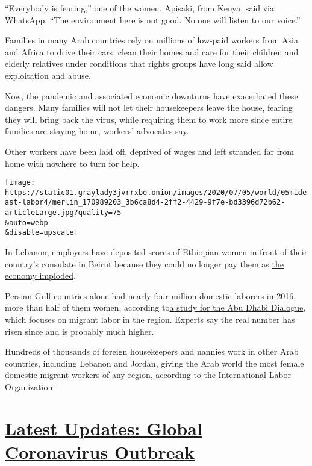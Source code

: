``Everybody is fearing,'' one of the women, Apisaki, from Kenya, said
via WhatsApp. ``The environment here is not good. No one will listen to
our voice.''

Families in many Arab countries rely on millions of low-paid workers
from Asia and Africa to drive their cars, clean their homes and care for
their children and elderly relatives under conditions that rights groups
have long said allow exploitation and abuse.

Now, the pandemic and associated economic downturns have exacerbated
these dangers. Many families will not let their housekeepers leave the
house, fearing they will bring back the virus, while requiring them to
work more since entire families are staying home, workers' advocates
say.

Other workers have been laid off, deprived of wages and left stranded
far from home with nowhere to turn for help.

\texttt{[image: https://static01.graylady3jvrrxbe.onion/images/2020/07/05/world/05mideast-labor4/merlin\_170989203\_3b6ca8d4-2ff2-4429-9f7e-bd3396d72b62-articleLarge.jpg?quality=75\\\&auto=webp\\\&disable=upscale]}

In Lebanon, employers have deposited scores of Ethiopian women in front
of their country's consulate in Beirut because they could no longer pay
them as
\href{https://www.nytimes3xbfgragh.onion/2020/05/10/world/middleeast/lebanon-economic-crisis.html}{the
economy imploded}.

Persian Gulf countries alone had nearly four million domestic laborers
in 2016, more than half of them women, according
to\href{http://abudhabidialogue.org/sites/default/files/document-library/2018_Future\%20of\%20Domestic\%20Work\%20Study.pdf}{a
study for the Abu Dhabi Dialogue}, which focuses on migrant labor in the
region. Experts say the real number has risen since and is probably much
higher.

Hundreds of thousands of foreign housekeepers and nannies work in other
Arab countries, including Lebanon and Jordan, giving the Arab world the
most female domestic migrant workers of any region, according to the
International Labor Organization.

\hypertarget{latest-updates-global-coronavirus-outbreak}{%
\section{\texorpdfstring{\href{https://www.nytimes3xbfgragh.onion/2020/08/04/world/coronavirus-cases.html?action=click\&pgtype=Article\&state=default\&region=MAIN_CONTENT_1\&context=storylines_live_updates}{Latest
Updates: Global Coronavirus
Outbreak}}{Latest Updates: Global Coronavirus Outbreak}}\label{latest-updates-global-coronavirus-outbreak}}

